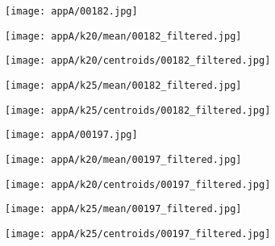 \documentclass[draft,final]{vutinfth} %
\begin{document}
\begin{appendices}
\begin{figure}[h]
\centering
  \begin{subfigure}[b]{0.19\columnwidth}
    \centering
    \texttt{[image: appA/00182.jpg]}
  \end{subfigure}
  \begin{subfigure}[b]{0.19\columnwidth}
    \centering
    \texttt{[image: appA/k20/mean/00182\_filtered.jpg]}
  \end{subfigure}
  \begin{subfigure}[b]{0.19\columnwidth}
    \centering
    \texttt{[image: appA/k20/centroids/00182\_filtered.jpg]}
  \end{subfigure}
  \begin{subfigure}[b]{0.19\columnwidth}
    \centering
    \texttt{[image: appA/k25/mean/00182\_filtered.jpg]}
  \end{subfigure}
  \begin{subfigure}[b]{0.19\columnwidth}
    \centering
    \texttt{[image: appA/k25/centroids/00182\_filtered.jpg]}
  \end{subfigure}
\caption{}
\end{figure}  

\begin{figure}[h]
\centering
  \begin{subfigure}[b]{0.19\columnwidth}
    \centering
    \texttt{[image: appA/00197.jpg]}
  \end{subfigure}
  \begin{subfigure}[b]{0.19\columnwidth}
    \centering
    \texttt{[image: appA/k20/mean/00197\_filtered.jpg]}
  \end{subfigure}
  \begin{subfigure}[b]{0.19\columnwidth}
    \centering
    \texttt{[image: appA/k20/centroids/00197\_filtered.jpg]}
  \end{subfigure}
  \begin{subfigure}[b]{0.19\columnwidth}
    \centering
    \texttt{[image: appA/k25/mean/00197\_filtered.jpg]}
  \end{subfigure}
  \begin{subfigure}[b]{0.19\columnwidth}
    \centering
    \texttt{[image: appA/k25/centroids/00197\_filtered.jpg]}
  \end{subfigure}
\caption{}
\end{figure}  


\end{appendices}
\end{document}

